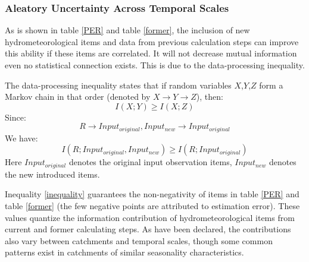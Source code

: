 \documentclass[review]{elsarticle}
\begin{document}
\subsubsection{Aleatory Uncertainty Across Temporal Scales}
As is shown in table \ref{PER} and table \ref{former}, the inclusion of new hydrometeorological items and data from previous calculation steps can improve this ability if these items are correlated. It will not decrease mutual information even no statistical connection exists. This is due to the data-processing inequality\citep{cover2012elements}.  

The data-processing inequality states that if random variables $X$,$Y$,$Z$ form a Markov chain in that order (denoted by $X \rightarrow Y \rightarrow Z$), then:
\begin{equation}
I(X;Y) \geq I(X;Z)
\end{equation}
Since:
\begin{equation}
R \rightarrow Input_{original},Input_{new} \rightarrow Input_{original}
\end{equation} 
We have:
\begin{equation}
\label{inequality}
I(R;Input_{original},Input_{new}) \geq I(R;Input_{original})
\end{equation}
Here $Input_{original}$ denotes the original input observation items, $Input_{new}$ denotes the new introduced items.  

Inequality \ref{inequality} guarantees the non-negativity of items in table \ref{PER} and table \ref{former} (the few negative points are attributed to estimation error).  
These values quantize the information contribution of  hydrometeorological items from current and former calculating steps. As have been declared, the contributions also vary between catchments and temporal scales, though some common patterns exist in catchments of similar seasonality characteristics.



\end{document}
